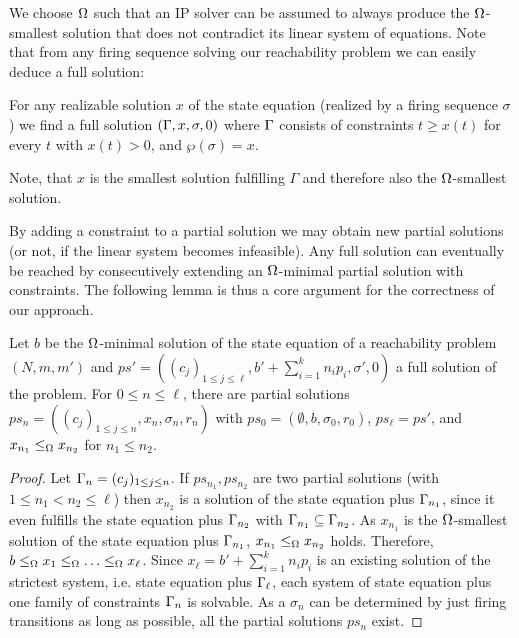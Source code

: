 \documentclass{LMCS}
\newcommand{\parikh}{\wp}
\begin{document}
We choose $\Omega$ such that an IP solver can be assumed to always 
produce the $\Omega$-smallest solution that does not contradict its linear system of equations.
Note that from any firing sequence solving our reachability problem we can easily deduce a full solution:

\begin{cor}
For any realizable solution $x$ of the state equation (realized by a firing sequence $\sigma$)
we find a full solution $({\Gamma},x,\sigma,0)$
where ${\Gamma}$ consists of constraints $t\geq x(t)$ for every $t$ with $x(t)>0$, and $\parikh(\sigma)=x$.
\end{cor}
Note, that $x$ is the smallest solution fulfilling $\Gamma$ and therefore also the $\Omega$-smallest solution.

By adding a constraint to a partial solution we may obtain new partial solutions (or not, if the linear
system becomes infeasible). Any full solution can eventually be reached by consecutively extending an $\Omega$-minimal 
partial solution with constraints. The following lemma is thus a core argument for the correctness of our approach.

\begin{lem}\label{L.PTFL}
Let $b$ be the $\Omega$-minimal solution of the state equation of a reachability problem $(N,m,m')$ and 
$ps'=((c_j)_{1\le j\le\ell},b'+\sum_{i=1}^kn_ip_i,\sigma',0)$ a full solution of the problem. 
For $0\le n\le\ell$, there are partial solutions $ps_n=((c_j)_{1\le j\le n},x_n,\sigma_n,r_n)$
with $ps_0=(\emptyset,b,\sigma_0,r_0)$, $ps_\ell=ps'$, and $x_{n_1}\le_{\Omega} x_{n_2}$ for $n_1\le n_2$.
\end{lem}
\begin{proof}
Let ${\Gamma}_n=(c_j)_{1\le j\le n}$.
If $ps_{n_1},ps_{n_2}$ are two partial solutions (with $1\le n_1<n_2\le\ell$) then $x_{n_2}$ is a solution
of the state equation plus ${\Gamma}_{n_1}$, since it even fulfills the state equation plus ${\Gamma}_{n_2}$ with ${\Gamma}_{n_1}\subseteq {\ensuremath \Gamma}_{n_2}$.
As $x_{n_1}$ is the $\Omega$-smallest solution of the state equation plus ${\Gamma}_{n_1}$, $x_{n_1}\le_{\Omega} x_{n_2}$ holds.
Therefore, $b\le_{\Omega} x_1\le_{\Omega} \ldots \le_{\Omega} x_\ell$. Since $x_\ell=b'+\sum_{i=1}^kn_ip_i$ is an existing solution of the
strictest system, i.e. state equation plus ${\Gamma}_\ell$, each system of state equation plus one family of constraints ${\Gamma}_n$
is solvable. As a $\sigma_n$ can be determined by just firing transitions as long as possible, all the partial
solutions $ps_n$ exist.
\end{proof}
\end{document}
